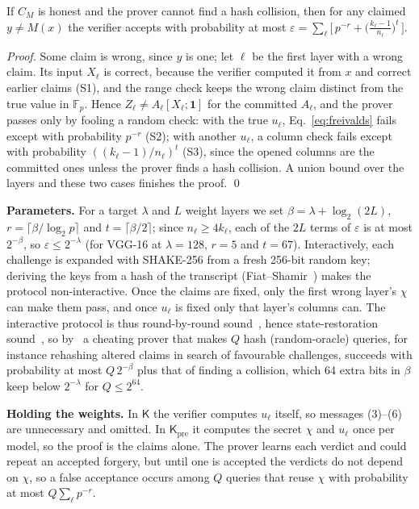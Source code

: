 \documentclass[sigconf,nonacm]{acmart}
\newcommand{\F}{\mathbb{F}_p}
\newcommand{\Kpre}{\mathsf{K}_{\mathrm{pre}}}
\newcommand{\sK}{\mathsf{K}}
\newcommand{\para}[1]{\par\noindent\textbf{#1}\quad}
\begin{document}
\begin{theorem}[soundness]
\label{thm:sound}
If $C_M$ is honest and the prover cannot find a hash collision, then for any claimed
$y \neq M(x)$ the verifier accepts with probability at most
$\varepsilon = \sum_\ell \big[\,p^{-r} + \big(\tfrac{k_\ell - 1}{n_\ell}\big)^{t}\,\big]$.
\end{theorem}

\noindent\emph{Proof.} Some claim is wrong, since $y$ is one; let $\ell$ be the first layer with a
wrong claim. Its input $X_\ell$ is correct, because the verifier computed it from $x$ and correct
earlier claims (S1), and the range check keeps the wrong claim distinct from the true value in
$\F$. Hence $Z_\ell \neq A_\ell[X_\ell;\mathbf 1]$ for the committed $A_\ell$, and the prover passes
only by fooling a random check: with the true $u_\ell$, Eq.~\eqref{eq:freivalds} fails except
with probability $p^{-r}$ (S2); with another $u_\ell$, a column check fails except with
probability $((k_\ell-1)/n_\ell)^t$ (S3), since the opened columns are the committed ones unless
the prover finds a hash collision. A union bound over the layers and these two cases finishes the proof. \qed

\para{Parameters.} For a target $\lambda$ and $L$ weight layers we set
$\beta = \lambda + \log_2(2L)$, $r = \lceil \beta/\log_2 p \rceil$ and $t = \lceil \beta/2
\rceil$; since $n_\ell \ge 4k_\ell$, each of the $2L$ terms of $\varepsilon$ is at most
$2^{-\beta}$, so $\varepsilon \le 2^{-\lambda}$ (for VGG-16 at $\lambda{=}128$, $r{=}5$ and
$t{=}67$). Interactively, each challenge is expanded with SHAKE-256 from a fresh 256-bit random
key; deriving the keys from a hash of the transcript (Fiat--Shamir~\cite{fiatshamir1986})
makes the protocol non-interactive. Once the claims are fixed, only the first wrong layer's $\chi$
can make them pass, and once $u_\ell$ is fixed only that layer's columns can. The interactive protocol is thus
round-by-round sound~\cite{canetti2019fs}, hence state-restoration sound~\cite{canetti2019fs,holmgren2019rbr}, so by~\cite{bcs16} a cheating prover that makes $Q$ hash (random-oracle) queries, for instance rehashing altered claims in search of favourable challenges, succeeds with probability at most $Q\,2^{-\beta}$ plus that of finding a collision, which
64 extra bits in $\beta$ keep below $2^{-\lambda}$ for $Q \le 2^{64}$.

\para{Holding the weights.} In $\sK$ the verifier computes $u_\ell$ itself, so messages (3)--(6) are
unnecessary and omitted. In $\Kpre$ it computes the secret $\chi$ and $u_\ell$ once per model, so the proof is
the claims alone. The prover learns each verdict and could repeat an accepted forgery, but until
one is accepted the verdicts do not depend on $\chi$, so a false acceptance occurs among $Q$
queries that reuse $\chi$ with probability at most $Q\sum_\ell p^{-r}$.
\end{document}
